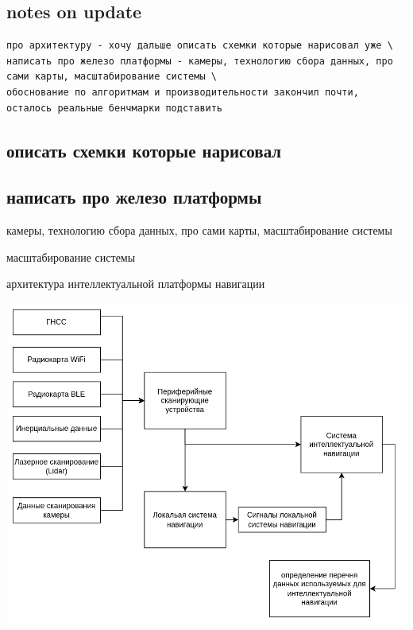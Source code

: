 \hypertarget{notes-on-update}{%
\subsection{notes on update}\label{notes-on-update}}

\begin{verbatim}
про архитектуру - хочу дальше описать схемки которые нарисовал уже \
написать про железо платформы - камеры, технологию сбора данных, про сами карты, масштабирование системы \
обоснование по алгоритмам и производительности закончил почти, осталось реальные бенчмарки подставить
\end{verbatim}

\hypertarget{ux43eux43fux438ux441ux430ux442ux44c-ux441ux445ux435ux43cux43aux438-ux43aux43eux442ux43eux440ux44bux435-ux43dux430ux440ux438ux441ux43eux432ux430ux43b}{%
\subsection{описать схемки которые
нарисовал}\label{ux43eux43fux438ux441ux430ux442ux44c-ux441ux445ux435ux43cux43aux438-ux43aux43eux442ux43eux440ux44bux435-ux43dux430ux440ux438ux441ux43eux432ux430ux43b}}

\hypertarget{ux43dux430ux43fux438ux441ux430ux442ux44c-ux43fux440ux43e-ux436ux435ux43bux435ux437ux43e-ux43fux43bux430ux442ux444ux43eux440ux43cux44b}{%
\subsection{написать про железо
платформы}\label{ux43dux430ux43fux438ux441ux430ux442ux44c-ux43fux440ux43e-ux436ux435ux43bux435ux437ux43e-ux43fux43bux430ux442ux444ux43eux440ux43cux44b}}

камеры, технологию сбора данных, про сами карты, масштабирование системы

масштабирование системы

архитектура интеллектуальной платформы навигации

\includegraphics{2022-09-04-18-28-34.png}

